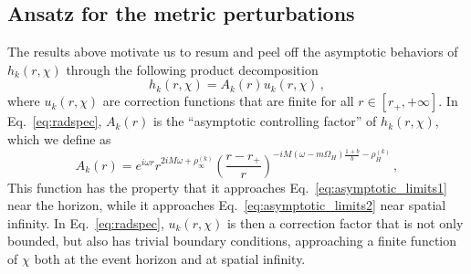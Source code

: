 \documentclass[aps,prx,amsmath,floats,floatfix,twocolumn,
  superscriptaddress,nofootinbib,showpacs]{revtex4-1}
\newcommand{\be}{\begin{equation}}
\newcommand{\ee}{\end{equation}}
\begin{document}
\subsection{Ansatz for the metric perturbations}
\label{sec:ansatz}

The results above motivate us to resum and peel off the asymptotic behaviors of $h_k(r, \chi)$ through the following product decomposition
\be \label{eq:radspec}
h_k(r, \chi) = A_k(r)  u_k(r, \chi) \,,
\ee
%
where $u_k(r, \chi)$ are correction functions that are finite for all $r\in[r_+, +\infty]$. 
In Eq.~\eqref{eq:radspec}, $A_k(r)$ is the ``asymptotic controlling factor'' of $h_k(r, \chi)$, which we define as
\begin{equation}\label{eq:asym_prefactor}
A_k(r) = e^{i \omega r} r^{2 i M \omega + \rho_{\infty}^{(k)}} \left( \frac{r-r_+}{r}\right)^{-i M (\omega - m \Omega_{H}) \frac{1+b}{b}- \rho_H^{(k)}}\,,
\end{equation}
This function has the property that it approaches Eq.~\eqref{eq:asymptotic_limits1} near the horizon, while it approaches Eq.~\eqref{eq:asymptotic_limits2} near spatial infinity. 
In Eq.~\eqref{eq:radspec}, $u_k(r, \chi)$ is then a correction factor that is not only bounded, but also has trivial boundary conditions, approaching a finite function of $\chi$ both at the event horizon and at spatial infinity.  
\end{document}
